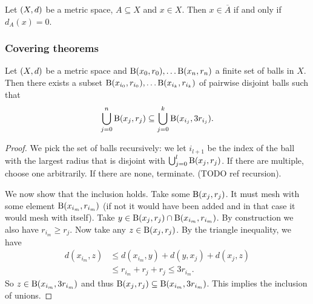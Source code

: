 \begin{lemma}
Let $\sSet{X,d}$ be a metric space, $A\subseteq X$ and $x\in X$. Then $x\in \overline{A}$ \textup{if and only if} $d_A(x) = 0$.
\end{lemma}



\subsubsection{Covering theorems}
\begin{proposition}
Let $\sSet{X,d}$ be a metric space and $\operatorname{B}(x_0, r_0), \ldots \operatorname{B}(x_n, r_n)$ a finite set of balls in $X$. Then there exists a subset $\operatorname{B}(x_{i_0}, r_{i_0}), \ldots \operatorname{B}(x_{i_k}, r_{i_k})$ of pairwise disjoint balls such that
\[ \bigcup_{j=0}^n\operatorname{B}(x_j, r_j) \subseteq \bigcup_{j=0}^k \operatorname{B}(x_{i_j}, 3r_{i_j}). \]
\end{proposition}
\begin{proof}
We pick the set of balls recursively: we let $i_{l+1}$ be the index of the ball with the largest radius that is disjoint with $\bigcup_{j=0}^l \operatorname{B}(x_j, r_j)$. If there are multiple, choose one arbitrarily. If there are none, terminate. (TODO ref recursion).

We now show that the inclusion holds. Take some $\operatorname{B}(x_j, r_j)$. It must mesh with some element $\operatorname{B}(x_{i_m}, r_{i_m})$ (if not it would have been added and in that case it would mesh with itself). Take $y\in \operatorname{B}(x_j, r_j) \cap \operatorname{B}(x_{i_m}, r_{i_m})$. By construction we also have $r_{i_m} \geq r_j$. Now take any $z\in \operatorname{B}(x_j, r_j)$. By the triangle inequality, we have
\begin{align*}
d(x_{i_m}, z) &\leq d(x_{i_m}, y) + d(y, x_j) + d(x_j, z) \\
&\leq r_{i_m} + r_j + r_j \leq 3r_{i_m}.
\end{align*}
So $z\in \operatorname{B}(x_{i_m}, 3r_{i_m})$ and thus $\operatorname{B}(x_j, r_j)\subseteq\operatorname{B}(x_{i_m}, 3r_{i_m})$. This implies the inclusion of unions.
\end{proof}

